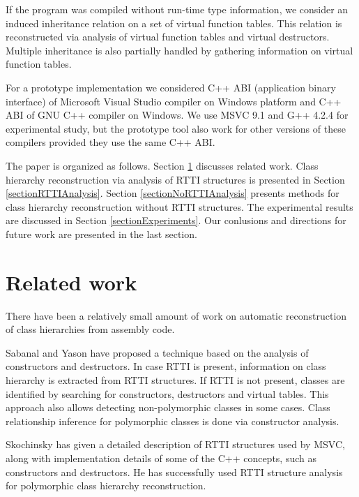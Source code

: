 \documentclass[times, 10pt,twocolumn]{article}
\begin{document}
If the program was compiled without run-time type information,
we consider an induced inheritance relation on
a set of virtual function tables.
This relation is reconstructed via analysis of virtual function
tables and virtual destructors.
Multiple inheritance is also partially handled by gathering
information on virtual function tables.

For a prototype implementation we considered C++ ABI
(application binary interface) of Microsoft Visual Studio
compiler on Windows platform and C++ ABI
of GNU C++ compiler on Windows. We use MSVC 9.1 and G++ 4.2.4
for experimental study, but the prototype tool also work for
other versions of these compilers provided they use the same C++ ABI.

The paper is organized as follows. Section
\ref{sectionRelatedWork} discusses related work.
Class hierarchy reconstruction via analysis of RTTI structures
is presented in Section \ref{sectionRTTIAnalysis}.
Section \ref{sectionNoRTTIAnalysis} presents methods for class
hierarchy reconstruction without RTTI structures.
The experimental results are discussed in Section \ref{sectionExperiments}.
Our conlusions and directions for future work are
presented in the last section.


\section{Related work}
\label{sectionRelatedWork}

There have been a relatively small amount of work
on automatic reconstruction of class hierarchies from assembly code. 

Sabanal and Yason \cite{sabanal07} have proposed
a technique based on the analysis of constructors and destructors.
In case RTTI is present,
information on class hierarchy is extracted from RTTI structures.
If RTTI is not present, classes are identified by searching for constructors,
destructors and virtual tables.
This approach also allows detecting non-polymorphic classes in some cases.
Class relationship inference for polymorphic classes is done via constructor
analysis.

Skochinsky \cite{skochinsky06} has given a detailed description
of RTTI structures used by MSVC,
along with implementation details of some of the C++ concepts,
such as constructors and destructors.
He has successfully used RTTI structure analysis
for polymorphic class hierarchy reconstruction.
\end{document}
